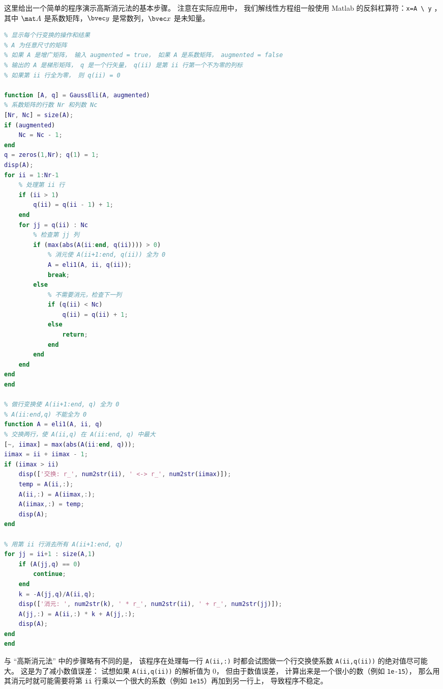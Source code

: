 

这里给出一个简单的程序演示高斯消元法的基本步骤。 注意在实际应用中， 我们解线性方程组一般使用 Matlab 的反斜杠算符：\verb|x=A \ y| ，其中 $\mat A$ 是系数矩阵，$\bvec y$ 是常数列，$\bvec x$ 是未知量。

\begin{lstlisting}[language=matlab, caption=GaussEli.m]
% 高斯消元法得到梯形系数矩阵
% 显示每个行变换的操作和结果
% A 为任意尺寸的矩阵
% 如果 A 是增广矩阵， 输入 augmented = true， 如果 A 是系数矩阵， augmented = false
% 输出的 A 是梯形矩阵， q 是一个行矢量， q(ii) 是第 ii 行第一个不为零的列标
% 如果第 ii 行全为零， 则 q(ii) = 0

function [A, q] = GaussEli(A, augmented)
% 系数矩阵的行数 Nr 和列数 Nc
[Nr, Nc] = size(A);
if (augmented)
    Nc = Nc - 1;
end
q = zeros(1,Nr); q(1) = 1;
disp(A);
for ii = 1:Nr-1
    % 处理第 ii 行
    if (ii > 1)
        q(ii) = q(ii - 1) + 1;
    end
    for jj = q(ii) : Nc
        % 检查第 jj 列
        if (max(abs(A(ii:end, q(ii)))) > 0)
            % 消元使 A(ii+1:end, q(ii)) 全为 0
            A = eli1(A, ii, q(ii));
            break;
        else
            % 不需要消元，检查下一列
            if (q(ii) < Nc)
                q(ii) = q(ii) + 1;
            else
                return;
            end
        end
    end
end
end

% 做行变换使 A(ii+1:end, q) 全为 0
% A(ii:end,q) 不能全为 0
function A = eli1(A, ii, q)
% 交换两行，使 A(ii,q) 在 A(ii:end, q) 中最大
[~, iimax] = max(abs(A(ii:end, q)));
iimax = ii + iimax - 1;
if (iimax > ii)
    disp(['交换: r_', num2str(ii), ' <-> r_', num2str(iimax)]);
    temp = A(ii,:);
    A(ii,:) = A(iimax,:);
    A(iimax,:) = temp;
    disp(A);
end

% 用第 ii 行消去所有 A(ii+1:end, q)
for jj = ii+1 : size(A,1)
    if (A(jj,q) == 0)
        continue;
    end
    k = -A(jj,q)/A(ii,q);
    disp(['消元: ', num2str(k), ' * r_', num2str(ii), ' + r_', num2str(jj)]);
    A(jj,:) = A(ii,:) * k + A(jj,:);
    disp(A);
end
end
\end{lstlisting}

与 “高斯消元法” 中的步骤略有不同的是， 该程序在处理每一行 \verb|A(ii,:)|  时都会试图做一个行交换使系数 \verb|A(ii,q(ii))| 的绝对值尽可能大。 这是为了减小数值误差： 试想如果 \verb|A(ii,q(ii))| 的解析值为 0， 但由于数值误差， 计算出来是一个很小的数（例如 \verb|1e-15|）， 那么用其消元时就可能需要将第 \verb|ii| 行乘以一个很大的系数（例如 \verb|1e15|）再加到另一行上， 导致程序不稳定。

